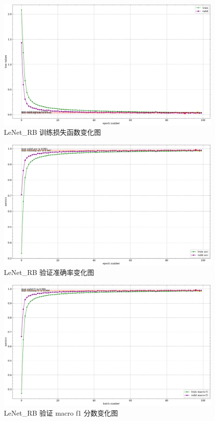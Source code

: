 \documentclass[supercite]{Experimental_Report}
\theoremstyle{definition}
\begin{document}
\begin{figure}[H]
	\begin{center}
		\includegraphics[scale=0.45]{../images/LeNetRB训练验证损失函数.pdf}
		\caption{LeNet\_RB 训练损失函数变化图}
		\label{LeNetRB训练验证损失函数}
	\end{center}
\end{figure}
\begin{figure}[H]
	\begin{center}
		\includegraphics[scale=0.45]{../images/LeNetRB训练验证acc.pdf}
		\caption{LeNet\_RB 验证准确率变化图}
		\label{LeNetRB训练验证acc}
	\end{center}
\end{figure}
\begin{figure}[H]
	\begin{center}
		\includegraphics[scale=0.45]{../images/LeNetRB训练验证f1.pdf}
		\caption{LeNet\_RB 验证 macro f1 分数变化图}
		\label{LeNetRB训练验证f1}
	\end{center}
\end{figure}
\end{document}
